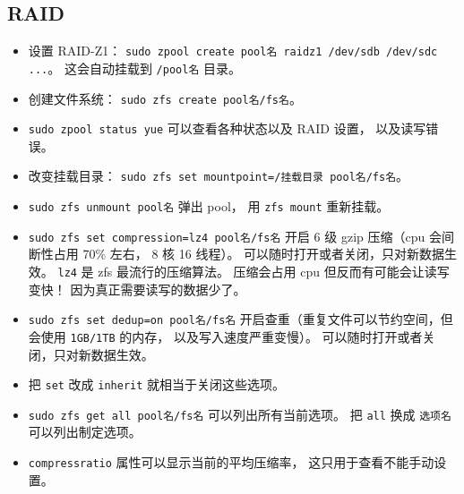 \subsection{RAID}
\begin{itemize}
\item 设置 RAID-Z1： \verb|sudo zpool create pool名 raidz1 /dev/sdb /dev/sdc ...|。 这会自动挂载到 \verb|/pool名| 目录。
\item 创建文件系统： \verb|sudo zfs create pool名/fs名|。
\item \verb|sudo zpool status yue| 可以查看各种状态以及 RAID 设置， 以及读写错误。
\item 改变挂载目录： \verb|sudo zfs set mountpoint=/挂载目录 pool名/fs名|。
\item \verb|sudo zfs unmount pool名| 弹出 pool， 用 \verb|zfs mount| 重新挂载。
\item \verb|sudo zfs set compression=lz4 pool名/fs名| 开启 6 级 gzip 压缩（cpu 会间断性占用 70\% 左右， 8 核 16 线程）。 可以随时打开或者关闭，只对新数据生效。 \verb|lz4| 是 zfs 最流行的压缩算法。 压缩会占用 cpu 但反而有可能会让读写变快！ 因为真正需要读写的数据少了。
\item \verb|sudo zfs set dedup=on pool名/fs名| 开启查重（重复文件可以节约空间，但会使用 \verb|1GB/1TB| 的内存， 以及写入速度严重变慢）。 可以随时打开或者关闭，只对新数据生效。
\item 把 \verb|set| 改成 \verb|inherit| 就相当于关闭这些选项。
\item \verb|sudo zfs get all pool名/fs名| 可以列出所有当前选项。 把 \verb|all| 换成 \verb|选项名| 可以列出制定选项。
\item \verb|compressratio| 属性可以显示当前的平均压缩率， 这只用于查看不能手动设置。
\end{itemize}

